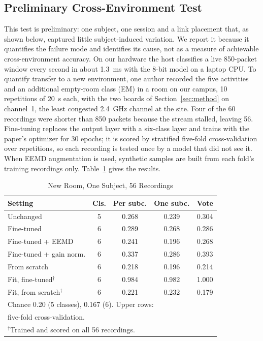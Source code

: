\documentclass[journal]{IEEEtran}
\begin{document}
\subsection{Preliminary Cross-Environment Test}
\label{sec:room}
This test is preliminary: one subject, one session and a link placement that, as shown
below, captured little subject-induced variation. We report it because it quantifies
the failure mode and identifies its cause, not as a measure of achievable
cross-environment accuracy.
On our hardware the host classifies a live 850-packet window every second in about
1.3~ms with the 8-bit model on a laptop CPU. To quantify transfer to a new
environment, one author recorded the five activities and an additional empty-room
class (EM) in a room on our campus, 10 repetitions of 20~s each, with the two boards
of Section~\ref{sec:method} on channel~1, the least congested 2.4~GHz channel at the
site. Four of the 60 recordings were shorter than 850 packets because the stream
stalled, leaving 56. Fine-tuning replaces the output layer with a six-class layer
and trains with the paper's optimizer for 30 epochs; it is scored by stratified
five-fold cross-validation over repetitions, so each recording is tested once by a
model that did not see it. When EEMD augmentation is used, synthetic samples are
built from each fold's training recordings only. Table~\ref{tab:room} gives the
results.

\begin{table}[!t]
\caption{New Room, One Subject, 56 Recordings}
\label{tab:room}
\centering
\setlength{\tabcolsep}{3.5pt}
\begin{tabular}{lcccc}
\hline
Setting & Cls. & Per subc. & One subc. & Vote\\
\hline
Unchanged                 & 5 & 0.268 & 0.239 & 0.304\\
Fine-tuned                & 6 & 0.289 & 0.268 & 0.286\\
Fine-tuned + EEMD         & 6 & 0.241 & 0.196 & 0.268\\
Fine-tuned + gain norm.   & 6 & 0.337 & 0.286 & 0.393\\
From scratch              & 6 & 0.218 & 0.196 & 0.214\\
\hline
Fit, fine-tuned$^\dagger$   & 6 & 0.984 & 0.982 & 1.000\\
Fit, from scratch$^\dagger$ & 6 & 0.221 & 0.232 & 0.179\\
\hline
\multicolumn{5}{l}{\footnotesize Chance 0.20 (5 classes), 0.167 (6). Upper rows:}\\
\multicolumn{5}{l}{\footnotesize five-fold cross-validation.}\\
\multicolumn{5}{l}{\footnotesize $^\dagger$Trained and scored on all 56 recordings.}
\end{tabular}
\end{table}
\end{document}
